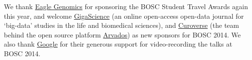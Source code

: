 \documentclass[10pt,oneside]{article}
\begin{document}
\noindent
We thank \href{http://www.eaglegenomics.com}{Eagle Genomics} for
sponsoring the BOSC Student Travel Awards again this year, and welcome 
\href{http://www.gigasciencejournal.com/}{GigaScience} (an online
open-access open-data journal for `big-data' studies in the life and
biomedical sciences), and \href{https://curoverse.com/}{Curoverse}
(the team behind the open source platform \href{http://arvados.org/}{Arvados})
as new sponsors for BOSC 2014. We also thank
\href{https://developers.google.com/open-source/}{Google}
for their generous support for video-recording the talks at BOSC 2014.
\end{document}
